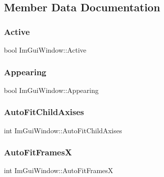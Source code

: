 \subsection{Member Data Documentation}
\hypertarget{struct_im_gui_window_a42f141fa0eed059176cb4360df1b1eb2}{}\label{struct_im_gui_window_a42f141fa0eed059176cb4360df1b1eb2} 
\subsubsection{\texorpdfstring{Active}{Active}}
{\footnotesize\ttfamily bool Im\+Gui\+Window\+::\+Active}

\hypertarget{struct_im_gui_window_a158ebb04d20cac09504fdbc4994eb017}{}\label{struct_im_gui_window_a158ebb04d20cac09504fdbc4994eb017} 
\subsubsection{\texorpdfstring{Appearing}{Appearing}}
{\footnotesize\ttfamily bool Im\+Gui\+Window\+::\+Appearing}

\hypertarget{struct_im_gui_window_ad323df685c026a4557912a5090414abe}{}\label{struct_im_gui_window_ad323df685c026a4557912a5090414abe} 
\subsubsection{\texorpdfstring{Auto\+Fit\+Child\+Axises}{AutoFitChildAxises}}
{\footnotesize\ttfamily int Im\+Gui\+Window\+::\+Auto\+Fit\+Child\+Axises}

\hypertarget{struct_im_gui_window_a4ec83127718940ff4e0e268dc45232cf}{}\label{struct_im_gui_window_a4ec83127718940ff4e0e268dc45232cf} 
\subsubsection{\texorpdfstring{Auto\+Fit\+FramesX}{AutoFitFramesX}}
{\footnotesize\ttfamily int Im\+Gui\+Window\+::\+Auto\+Fit\+FramesX}

